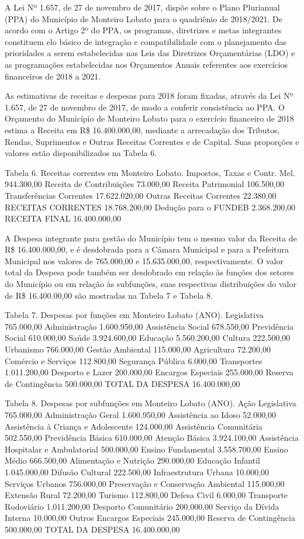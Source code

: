 A Lei Nº 1.657, de 27 de novembro de 2017, dispõe sobre o Plano Plurianual (PPA) do Município de Monteiro Lobato para o quadriênio de 2018/2021. De acordo com o Artigo 2º do PPA, os programas, diretrizes e metas integrantes constituem elo básico de integração e compatibilidade com o planejamento das prioridades a serem estabelecidas nas Leis das Diretrizes Orçamentárias (LDO) e as programações estabelecidas nos Orçamentos Anuais referentes aos exercícios financeiros de 2018 a 2021.

As estimativas de receitas e despesas para 2018 foram fixadas, através da Lei Nº 1.657, de 27 de novembro de 2017, de modo a conferir consistência ao PPA. O Orçamento do Município de Monteiro Lobato para o exercício financeiro de 2018 estima a Receita em R\$ 16.400.000,00, mediante a arrecadação dos Tributos, Rendas, Suprimentos e Outras Receitas Correntes e de Capital. Suas proporções e valores estão disponibilizados na Tabela 6. 

Tabela 6. Receitas correntes em Monteiro Lobato.
Impostos, Taxas e Contr. Mel.	944.300,00
Receita de Contribuições	73.000,00
Receita Patrimonial	106.500,00
Transferências Correntes	17.622.020,00
Outras Receitas Correntes	22.380,00
RECEITAS CORRENTES	18.768.200,00
Dedução para o FUNDEB	2.368.200,00
RECEITA FINAL	16.400.000,00

A Despesa integrante para gestão do Município tem o mesmo valor da Receita de R\$ 16.400.000,00, e é desdobrada para a Câmara Municipal e para a Prefeitura Municipal nos valores de 765.000,00 e 15.635.000,00, respectivamente. O valor total da Despesa pode também ser desdobrado em relação às funções dos setores do Município ou em relação às subfunções, suas respectivas distribuições do valor de R\$ 16.400.00,00 são mostradas na Tabela 7 e Tabela 8.

Tabela 7.  Despesas por funções em Monteiro Lobato (ANO).
Legislativa	765.000,00
Administração	1.600.950,00
Assistência Social	678.550,00
Previdência Social	610.000,00
Saúde	3.924.600,00
Educação	5.560.200,00
Cultura	222.500,00
Urbanismo	766.000,00
Gestão Ambiental	115.000,00
Agricultura	72.200,00
Comércio e Serviços	112.800,00
Segurança Pública	6.000,00
Transportes	1.011.200,00
Desporto e Lazer	200.000,00
Encargos Especiais	255.000,00
Reserva de Contingência	500.000,00
TOTAL DA DESPESA	16.400.000,00

Tabela 8. Despesas por subfunções em Monteiro Lobato (ANO).
Ação Legislativa	765.000,00
Administração Geral 	1.600.950,00
Assistência ao Idoso	52.000,00
Assistência à Criança e Adolescente 	124.000,00
Assistência Comunitária 	502.550,00
Previdência Básica	610.000,00
Atenção Básica	3.924.100,00
Assistência Hospitalar e Ambulatorial	500.000,00
Ensino Fundamental	3.558.700,00
Ensino Médio 	666.500,00
Alimentação e Nutrição 	290.000,00
Educação Infantil	1.045.000,00
Difusão Cultural 	222.500,00
Infraestrutura Urbana	10.000,00
Serviços Urbanos	756.000,00
Preservação e Conservação Ambiental 	115.000,00
Extensão Rural	72.200,00
Turismo	112.800,00
Defesa Civil	6.000,00
Transporte Rodoviário	1.011.200,00
Desporto Comunitário	200.000,00
Serviço da Dívida Interna	10.000,00
Outros Encargos Especiais	245.000,00
Reserva de Contingência	500.000,00
TOTAL DA DESPESA	16.400.000,00

